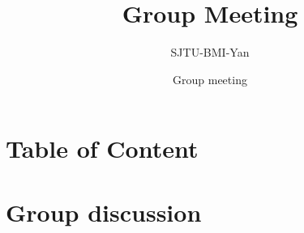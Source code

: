 \documentclass[10pt,aspectratio=169]{beamer} \newif\ifwideas\wideastrue
\begin{document}

\title{Group Meeting }%
%
%
\author{SJTU-BMI-Yan}
\smallskip%
\date{Group meeting }
\maketitle



\section{Table of Content}
\begin{frame}
\frametitle{\secname}
\tableofcontents
\end{frame}



\section{Group discussion}
\begin{frame}
\frametitle{\secname}

\end{frame}
\end{document}
